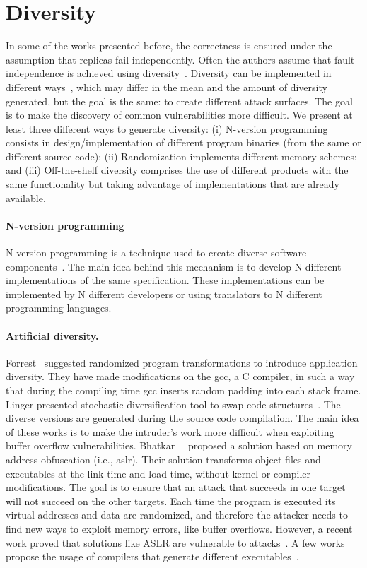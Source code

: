\section{Diversity}

In some of the works presented before, the correctness is ensured under the assumption that replicas fail independently. 
Often the authors assume that fault independence is achieved using diversity~\cite{Castro:2002,Sousa:2010}. 
Diversity can be implemented in different ways~\cite{Deswarte:1999,Obelheiro:2006}, which may differ in the mean and the amount of diversity generated, but the goal is the same: to create different attack surfaces. 
The goal is to make the discovery of common vulnerabilities more difficult. 
We present at least three different ways to generate diversity: 
(i) N-version programming consists in design/implementation of different program binaries (from the same or different source code); 
(ii) Randomization implements different memory schemes; 
and (iii) Off-the-shelf diversity comprises the use of different products with the same functionality but taking advantage of implementations that are already available.


\paragraph{N-version programming}
N-version programming is a technique used to create diverse software components~\cite{Avizienis:1977,Knight:1986,Chen:1995}.
The main idea behind this mechanism is to develop N different implementations of the same specification. 
These implementations can be implemented by N different developers or using translators to N different programming languages.

\paragraph{Artificial diversity.} 
Forrest~\cite{Forrest:1997} suggested randomized program transformations to introduce application diversity. 
They have made modifications on the gcc, a C compiler, in such a way that during the compiling time gcc inserts random padding
into each stack frame. 
Linger presented stochastic diversification tool to swap code structures~\cite{Bairavasundaram:2009,Larsen:2014}. 
The diverse versions are generated during the source code compilation. 
The main idea of these works is to make the intruder’s work more difficult when exploiting buffer overflow vulnerabilities.
Bhatkar~\etal{}~\cite{Bhatkar:2003} proposed a solution based on memory address obfuscation (i.e., \gls{aslr}). 
Their solution transforms object files and executables at the link-time and load-time, without kernel or compiler modifications. 
The goal is to ensure that an attack that succeeds in one target will not succeed on the other targets. 
Each time the program is executed its virtual addresses and data are randomized, and therefore the attacker needs to find new ways to exploit memory errors, like buffer overflows. 
However, a recent work proved that solutions like ASLR are vulnerable to attacks~\cite{Bittau:2014}.
A few works propose the usage of compilers that generate different executables~\cite{Platania:2014,Roeder:2010,King:2016}.


